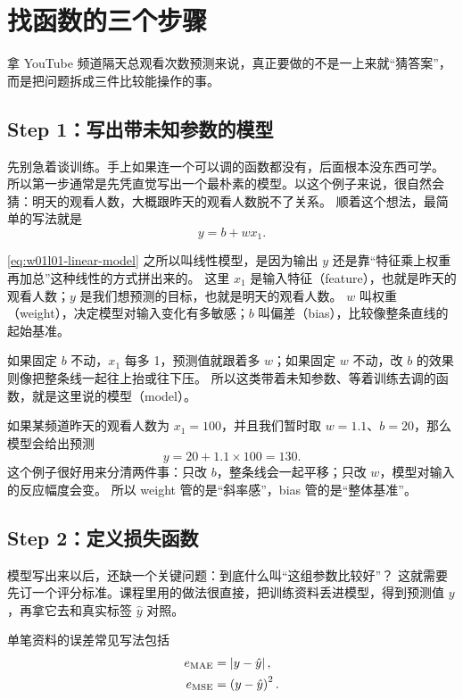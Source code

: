 \documentclass[main.tex]{subfiles}
\begin{document}
\section{找函数的三个步骤}
\label{sec:w01l01-three-steps}

拿 YouTube 频道隔天总观看次数预测来说，真正要做的不是一上来就“猜答案”，而是把问题拆成三件比较能操作的事。

\subsection{Step 1：写出带未知参数的模型}
\label{sec:w01l01-model}

先别急着谈训练。手上如果连一个可以调的函数都没有，后面根本没东西可学。
所以第一步通常是先凭直觉写出一个最朴素的模型。以这个例子来说，很自然会猜：明天的观看人数，大概跟昨天的观看人数脱不了关系。
顺着这个想法，最简单的写法就是
\begin{equation}
  y = b + w x_1.
  \label{eq:w01l01-linear-model}
\end{equation}

\cref{eq:w01l01-linear-model} 之所以叫线性模型，是因为输出 $y$ 还是靠“特征乘上权重再加总”这种线性的方式拼出来的。
这里 $x_1$ 是输入特征（feature），也就是昨天的观看人数；$y$ 是我们想预测的目标，也就是明天的观看人数。
$w$ 叫权重（weight），决定模型对输入变化有多敏感；$b$ 叫偏差（bias），比较像整条直线的起始基准。

如果固定 $b$ 不动，$x_1$ 每多 1，预测值就跟着多 $w$；如果固定 $w$ 不动，改 $b$ 的效果则像把整条线一起往上抬或往下压。
所以这类带着未知参数、等着训练去调的函数，就是这里说的模型（model）。

\begin{examplebox}
如果某频道昨天的观看人数为 $x_1=100$，并且我们暂时取 $w=1.1$、$b=20$，那么模型会给出预测
\[
  y = 20 + 1.1 \times 100 = 130.
\]
这个例子很好用来分清两件事：只改 $b$，整条线会一起平移；只改 $w$，模型对输入的反应幅度会变。
所以 weight 管的是“斜率感”，bias 管的是“整体基准”。
\end{examplebox}

\subsection{Step 2：定义损失函数}
\label{sec:w01l01-loss}

模型写出来以后，还缺一个关键问题：到底什么叫“这组参数比较好”？
这就需要先订一个评分标准。课程里用的做法很直接，把训练资料丢进模型，得到预测值 $y$，再拿它去和真实标签 $\hat{y}$ 对照。

单笔资料的误差常见写法包括
\begin{align}
  e_{\mathrm{MAE}} &= \left\lvert y - \hat{y} \right\rvert, \label{eq:w01l01-mae} \\
  e_{\mathrm{MSE}} &= \left( y - \hat{y} \right)^2. \label{eq:w01l01-mse}
\end{align}
\end{document}
